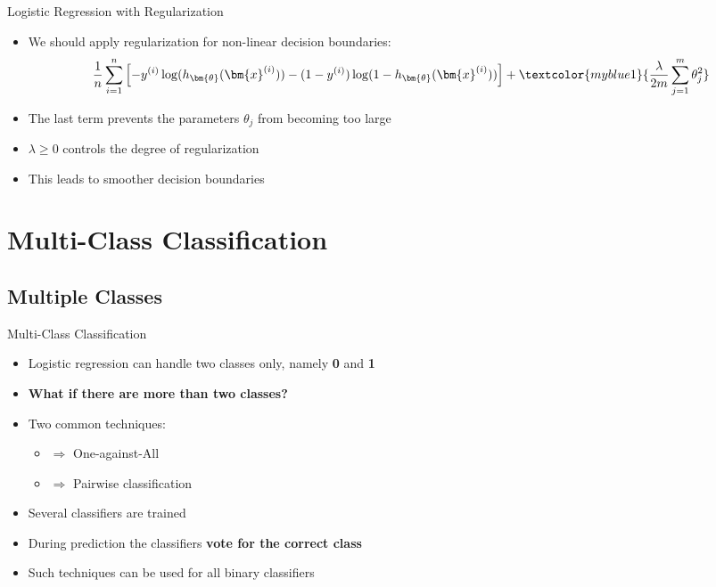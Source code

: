 \begin{frame}{Logistic Regression with Regularization}{}
	\begin{itemize}
		\item We should apply regularization for non-linear decision boundaries:
		\footnotesize
		\begin{equation}
			\frac{1}{n} \sum_{i=1}^n \left[
				-y^{(i)} \log(h_{\bm{\theta}}(\bm{x}^{(i)})) - (1 - y^{(i)}) \log(1 - h_{\bm{\theta}}(\bm{x}^{(i)}))
			\right] + \textcolor{myblue1}{\frac{\lambda}{2m} \sum_{j=1}^m \theta_j^2}
		\end{equation}
		\normalsize
		\item The last term prevents the parameters $\theta_j$ from becoming too large
		\item $\lambda \ge 0$ controls the degree of regularization
		\item This leads to smoother decision boundaries
	\end{itemize}
\end{frame}


\section{Multi-Class Classification}

\subsection{Multiple Classes}

\begin{frame}{Multi-Class Classification}{}
	\begin{itemize}
		\item Logistic regression can handle two classes only, namely \textbf{0} and \textbf{1}
		\item \textbf{What if there are more than two classes?}
		\item Two common techniques:
		\begin{itemize}
			\item {} 	$\Rightarrow$ One-against-All
			\item {} 	$\Rightarrow$ Pairwise classification
		\end{itemize}
		\item Several classifiers are trained
		\item During prediction the classifiers \textbf{vote for the correct class}
		\item Such techniques can be used for all binary classifiers
	\end{itemize}
\end{frame}


